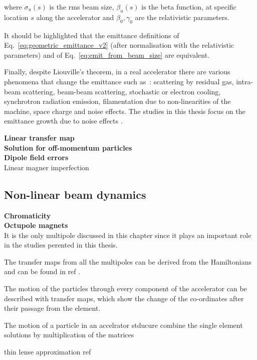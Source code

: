  where $\sigma_u(s)$ is the rms beam size, $\beta_u(s)$ is the beta function, at specific location $s$ along the accelerator and $\beta_0, \gamma_0$ are the relativistic parameters. 
 
 It should be highlighted that the emittance definitions of Eq.~\eqref{eq:geometric_emittance_v2} (after normalisation with the relativistic parameters) and of Eq.~\eqref{eq:emit_from_beam_size} are equivalent. 
 
 Finally, despite Liouville's theorem, in a real accelerator there are various phenomena that change the emittance such as~\cite{Buon:216507}: scattering by residual gas, intra-beam scattering, beam-beam scattering, stochastic or electron cooling, synchrotron radiation emission, filamentation due to non-linearities of the machine, space charge and noise effects. The studies in this thesis focus on the emittance growth due to noise effects .
 



\textbf{Linear transfer map}\\


\textbf{Solution for off-momentum particles}\\


\textbf{Dipole field errors}\\
Linear magner imperfection


\subsection{Non-linear beam dynamics}
\textbf{Chromaticity}\\

\textbf{Octupole magnets}\\
It is the only multipole discussed in this chapter since it plays an important role in the studies perented in this thesis.


The transfer maps from all the multipoles can be derived from the Hamiltonians and can be found in ref . 

The motion of the particles through every component of the accelerator can be described with transfer maps, which show the change of the co-ordinates after their passage from the element. 

The motion of a particle in an accelrator stducure combine the single element solutions by multiplication of the matrices


thin lense approximation ref




